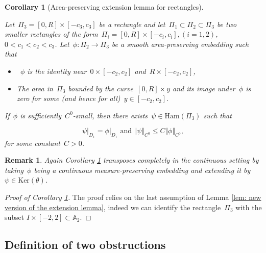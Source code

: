 \documentclass[10pt]{amsart}
\newtheorem{rk}[prop]{Remark}
\newtheorem{coro}{Corollary}
\newcommand{\Ker}{\mathrm{Ker}}
\begin{document}
\begin{coro}[Area-preserving extension lemma for rectangles]\label{coro: area-preserving extension lemma for rectangles}

Let~$\Pi_3=[0,R]\times [-c_3,c_3]$ be a rectangle and let~$\Pi_1\subset \Pi_2\subset\Pi_3$ be two smaller rectangles of the form~$\Pi_i=[0,R]\times [-c_i,c_i], (i=1,2)$,~$0<c_1<c_2<c_3$. Let~$\phi: \Pi_2 \rightarrow \Pi_3$ be a smooth area-preserving embedding such that 

\begin{itemize}
    \item~$\phi$ is the identity near~$0\times[-c_2,c_2]$ and~$R\times [-c_2,c_2]$,
    \item The area in~$\Pi_3$ bounded by the curve~$[0,R]\times y$ and its image under~$\phi$ is zero for some (and hence for all)~$y\in[-c_2,c_2]$.
\end{itemize}

If~$\phi$ is sufficiently~$C^0$-small, then there exists~$\psi \in \text{Ham}(\Pi_3)$ such that 

$$\psi \vert _{D_1}=\phi\vert_{D_1} \text{ and } \Vert\psi\Vert_{C^0}\leq C \Vert\phi \Vert_{C^0},$$
for some constant~$C>0$.

\end{coro}

\begin{rk}
Again Corollary \ref{coro: area-preserving extension lemma for rectangles} transposes completely in the continuous setting by taking~$\phi$ being a continuous measure-preserving embedding and extending it by~$\psi \in \Ker(\theta)$.
\end{rk}

\begin{proof}[Proof of Corollary \ref{coro: area-preserving extension lemma for rectangles}]
The proof relies on the last assumption of Lemma \ref{lem: new version of the extension lemma}, indeed we can identify the rectangle~$\Pi_3$ with the subset $I \times [-2,2] \subset \mathbb{A}_2$.
\end{proof}



\subsection{Definition of two obstructions}\label{subsec: def of the obstr}
\end{document}
